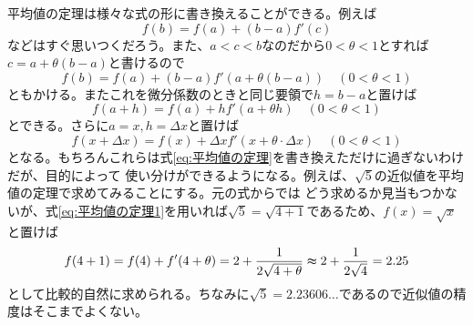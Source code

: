 \documentclass[a4j,dvipdfmx]{jsarticle}
\begin{document}
                    平均値の定理は様々な式の形に書き換えることができる。例えば
                    \begin{equation}
                        f(b)=f(a)+(b-a)f'(c)
                    \end{equation}
                    などはすぐ思いつくだろう。また、$a<c<b$なのだから$0<\theta<1$とすれば$c=a+\theta(b-a)$と書けるので
                    \begin{equation}
                        f(b)=f(a)+(b-a)f'(a+\theta(b-a))\quad(0<\theta<1)
                    \end{equation}
                    ともかける。またこれを微分係数のときと同じ要領で$h=b-a$と置けば
                    \begin{equation}
                        f(a+h)=f(a)+hf'(a+\theta h)\quad(0<\theta<1)\label{eq:平均値の定理1}
                    \end{equation}
                    とできる。さらに$a=x,h=\Delta x$と置けば
                    \begin{equation}
                        f(x+\Delta x)=f(x)+\Delta xf'(x+\theta\cdot\Delta x)\quad (0<\theta<1)\label{eq:平均値の定理x用}
                    \end{equation}
                    となる。もちろんこれらは式\eqref{eq:平均値の定理}を書き換えただけに過ぎないわけだが、目的によって
                    使い分けができるようになる。例えば、$\sqrt{5}$の近似値を平均値の定理で求めてみることにする。元の式からでは
                    どう求めるか見当もつかないが、式\eqref{eq:平均値の定理1}を用いれば$\sqrt{5}=\sqrt{4+1}$であるため、$f(x)=\sqrt{x}$と置けば
                    \begin{equation*}
                        f(4+1)=f(4)+f'(4+\theta)=2+\frac{1}{2\sqrt{4+\theta}}\thickapprox 2+\frac{1}{2\sqrt{4}}=2.25
                    \end{equation*}
                    として比較的自然に求められる。ちなみに$\sqrt{5}=2.23606\dots$であるので近似値の精度はそこまでよくない。
                \clearpage
\end{document}
